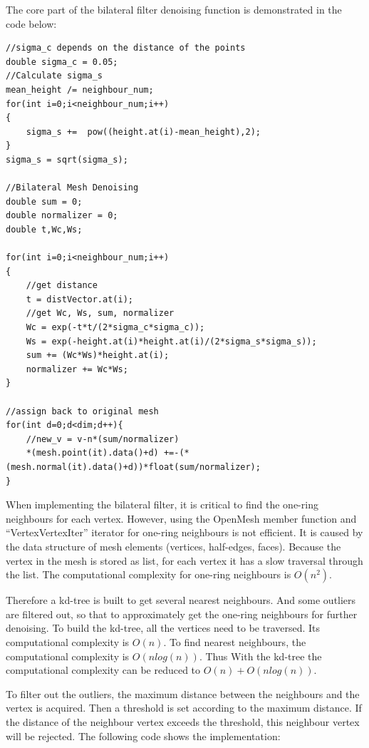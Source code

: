 The core part of the bilateral filter denoising function is demonstrated in the code below:
\begin{lstlisting}[xleftmargin=1em]
//sigma_c depends on the distance of the points
double sigma_c = 0.05; 
//Calculate sigma_s
mean_height /= neighbour_num;
for(int i=0;i<neighbour_num;i++)
{
	sigma_s +=  pow((height.at(i)-mean_height),2);
}
sigma_s = sqrt(sigma_s);

//Bilateral Mesh Denoising
double sum = 0;
double normalizer = 0;
double t,Wc,Ws;

for(int i=0;i<neighbour_num;i++)
{
	//get distance
	t = distVector.at(i);
	//get Wc, Ws, sum, normalizer
	Wc = exp(-t*t/(2*sigma_c*sigma_c));
	Ws = exp(-height.at(i)*height.at(i)/(2*sigma_s*sigma_s));
	sum += (Wc*Ws)*height.at(i);
	normalizer += Wc*Ws;
}

//assign back to original mesh
for(int d=0;d<dim;d++){
	//new_v = v-n*(sum/normalizer)
	*(mesh.point(it).data()+d) +=-(*(mesh.normal(it).data()+d))*float(sum/normalizer);
}
\end{lstlisting}

When implementing the bilateral filter, it is critical to find the one-ring neighbours for each vertex. However, using the OpenMesh member function and ``VertexVertexIter'' iterator for one-ring neighbours is not efficient. It is caused by the data structure of mesh elements (vertices, half-edges, faces). Because the vertex in the mesh is stored as list, for each vertex it has a slow traversal through the list. The computational complexity for one-ring neighbours is $O(n^2)$. 

Therefore a kd-tree is built to get several nearest neighbours. And some outliers are filtered out, so that to approximately get the one-ring neighbours for further denoising. To build the kd-tree, all the vertices need to be traversed. Its computational complexity is $O(n)$. To find nearest neighbours, the computational complexity is $O(nlog(n))$. Thus With the kd-tree the computational complexity can be reduced to $O(n)+O(nlog(n))$.

To filter out the outliers, the maximum distance between the neighbours and the vertex is acquired. Then a threshold is set according to the maximum distance. If the distance of the neighbour vertex exceeds the threshold, this neighbour vertex will be rejected. The following code shows the implementation:

